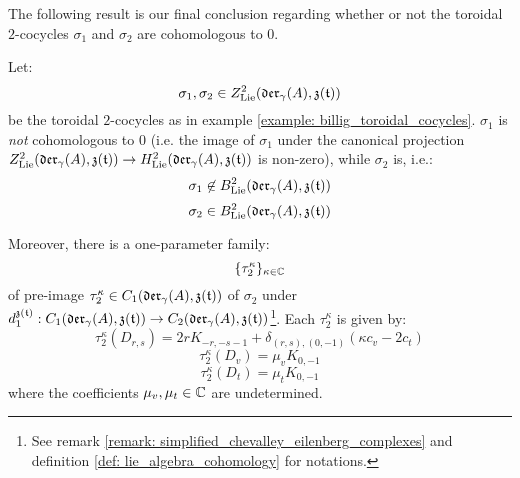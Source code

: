         The following result is our final conclusion regarding whether or not the toroidal $2$-cocycles $\sigma_1$ and $\sigma_2$ are cohomologous to $0$.
        \begin{proposition} \label{prop: cohomological_non_triviality_of_billig_toroidal_cocycles}
            Let:
                $$\sigma_1, \sigma_2 \in Z^2_{\mathrm{Lie}}(\mathfrak{der}_{\gamma}(A), \mathfrak{z}(\mathfrak{t}) )$$
            be the toroidal $2$-cocycles as in example \ref{example: billig_toroidal_cocycles}. $\sigma_1$ is \textit{not} cohomologous to $0$ (i.e. the image of $\sigma_1$ under the canonical projection $Z^2_{\mathrm{Lie}}(\mathfrak{der}_{\gamma}(A), \mathfrak{z}(\mathfrak{t}) ) \to H^2_{\mathrm{Lie}}(\mathfrak{der}_{\gamma}(A), \mathfrak{z}(\mathfrak{t}) )$ is non-zero), while $\sigma_2$ is, i.e.:
                $$\sigma_1 \not \in B^2_{\mathrm{Lie}}(\mathfrak{der}_{\gamma}(A), \mathfrak{z}(\mathfrak{t}))$$
                $$\sigma_2 \in B^2_{\mathrm{Lie}}(\mathfrak{der}_{\gamma}(A), \mathfrak{z}(\mathfrak{t}))$$
            
            Moreover, there is a one-parameter family:
                $$\{\tau_2^{\kappa}\}_{\kappa \in \mathbb{C}}$$
            of pre-image $\tau_2^{\kappa} \in C_1(\mathfrak{der}_{\gamma}(A), \mathfrak{z}(\mathfrak{t}))$ of $\sigma_2$ under $d_1^{\mathfrak{z}(\mathfrak{t})}: C_1(\mathfrak{der}_{\gamma}(A), \mathfrak{z}(\mathfrak{t})) \to C_2(\mathfrak{der}_{\gamma}(A), \mathfrak{z}(\mathfrak{t}))$\footnote{See remark \ref{remark: simplified_chevalley_eilenberg_complexes} and definition \ref{def: lie_algebra_cohomology} for notations.}. Each $\tau_2^{\kappa}$ is given by:
                $$\tau_2^{\kappa}(D_{r, s}) = 2r K_{-r, -s - 1} + \delta_{(r, s), (0, -1)} ( \kappa c_v - 2c_t )$$
                $$\tau_2^{\kappa}(D_v) = \mu_v K_{0, -1}$$
                $$\tau_2^{\kappa}(D_t) = \mu_t K_{0, -1}$$
            where the coefficients $\mu_v, \mu_t \in \mathbb{C}$ are undetermined.
        \end{proposition}
